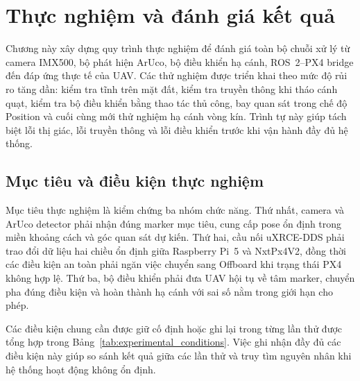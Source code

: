 \section{Thực nghiệm và đánh giá kết quả}

Chương này xây dựng quy trình thực nghiệm để đánh giá toàn bộ chuỗi xử lý từ camera IMX500, bộ phát hiện ArUco, bộ điều khiển hạ cánh, ROS~2--PX4 bridge đến đáp ứng thực tế của UAV. Các thử nghiệm được triển khai theo mức độ rủi ro tăng dần: kiểm tra tĩnh trên mặt đất, kiểm tra truyền thông khi tháo cánh quạt, kiểm tra bộ điều khiển bằng thao tác thủ công, bay quan sát trong chế độ Position và cuối cùng mới thử nghiệm hạ cánh vòng kín. Trình tự này giúp tách biệt lỗi thị giác, lỗi truyền thông và lỗi điều khiển trước khi vận hành đầy đủ hệ thống.

\subsection{Mục tiêu và điều kiện thực nghiệm}

Mục tiêu thực nghiệm là kiểm chứng ba nhóm chức năng. Thứ nhất, camera và ArUco detector phải nhận đúng marker mục tiêu, cung cấp pose ổn định trong miền khoảng cách và góc quan sát dự kiến. Thứ hai, cầu nối uXRCE-DDS phải trao đổi dữ liệu hai chiều ổn định giữa Raspberry Pi~5 và NxtPx4V2, đồng thời các điều kiện an toàn phải ngăn việc chuyển sang Offboard khi trạng thái PX4 không hợp lệ. Thứ ba, bộ điều khiển phải đưa UAV hội tụ về tâm marker, chuyển pha đúng điều kiện và hoàn thành hạ cánh với sai số nằm trong giới hạn cho phép.

Các điều kiện chung cần được giữ cố định hoặc ghi lại trong từng lần thử được tổng hợp trong Bảng~\ref{tab:experimental_conditions}. Việc ghi nhận đầy đủ các điều kiện này giúp so sánh kết quả giữa các lần thử và truy tìm nguyên nhân khi hệ thống hoạt động không ổn định.

